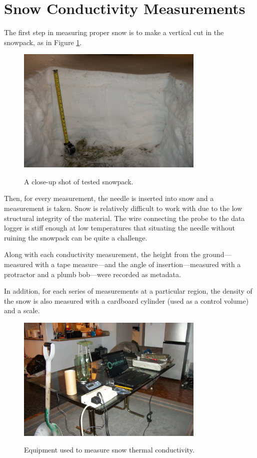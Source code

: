 \section{Snow Conductivity Measurements}

The first step in measuring proper snow is to make a vertical cut in the
snowpack, as in Figure \ref{fig:snowpack}.

\begin{figure}[h]
\centering
\includegraphics[width=0.8\textwidth]{fig/snowpack.jpg}
\label{fig:snowpack}
\caption{A close-up shot of tested snowpack.}
\end{figure}

Then, for every measurement, the needle is inserted into snow and a measurement
is taken. Snow is relatively difficult to work with due to the low structural 
integrity of the material.  The wire connecting the probe to the data logger is
stiff enough at low temperatures that situating the needle without ruining the
snowpack can be quite a challenge.

Along with each conductivity measurement, the height from the ground---measured
with a tape measure---and the angle of insertion---measured with a protractor
and a plumb bob---were recorded as metadata.

In addition, for each series of measurements at a particular region, the density
of the snow is also measured with a cardboard cylinder (used as a control volume)
and a scale.

\begin{figure}[h]
\centering
\includegraphics[width=0.8\textwidth]{fig/equipment.jpg}
\label{fig:equipment}
\caption{Equipment used to measure snow thermal conductivity.}
\end{figure}

